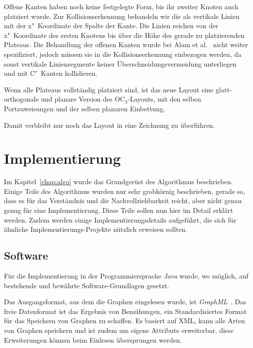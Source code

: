 \documentclass[a4paper]{scrreprt}
\theoremstyle{definition}
\begin{document}
Offene Kanten haben noch keine festgelegte Form, bis ihr zweiter Knoten auch platziert wurde. Zur Kollisionserkennung behandeln wir die als vertikale Linien mit der x"~Koordinate der Spalte der Kante. Die Linien reichen von der x"~Koordinate des ersten Knotens bis über die Höhe des gerade zu platzierenden Plateaus. Die Behandlung der offenen Kanten wurde bei Alam et al.~\cite{smooth-13} nicht weiter spezifiziert, jedoch müssen sie in die Kollisionserkennung einbezogen werden, da sonst vertikale Liniensegmente keiner Überschneidungsvermeidung unterliegen und mit C"~Kanten kollidieren.

Wenn alle Plateaus vollständig platziert sind, ist das neue Layout eine glatt-orthogonale und planare Version des OC$_3$-Layouts, mit den selben Portzuweisungen und der selben planaren Einbettung.

Damit verbleibt nur noch das Layout in eine Zeichnung zu überführen. 



\chapter{Implementierung}

Im Kapitel~\ref{chap:algo} wurde das Grundgerüst des Algorithmus beschrieben. Einige Teile des Algorithmus wurden nur sehr grobkörnig beschrieben, gerade so, dass es für das Verständnis und die Nachvollziehbarkeit reicht, aber nicht genau genug für eine Implementierung. Diese Teile sollen nun hier im Detail erklärt werden. Zudem werden einige Implementierungsdetails aufgeführt, die sich für ähnliche Implementierungs-Projekte nützlich erweisen sollten.

\section{Software}

Für die Implementierung in der Programmiersprache \emph{Java} wurde, wo möglich, auf bestehende und bewährte Software-Grundlagen gesetzt.

Das Ausgangsformat, aus dem die Graphen eingelesen wurde, ist \emph{GraphML}~\cite{brandes+al-14}. Das freie Datenformat ist das Ergebnis von Bemühungen, ein Standardisiertes Format für das Speichern von Graphen zu schaffen. Es basiert auf XML, kann alle Arten von Graphen speichern und ist zudem um eigene Attribute erweiterbar, diese Erweiterungen können beim Einlesen übersprungen werden.
\end{document}
